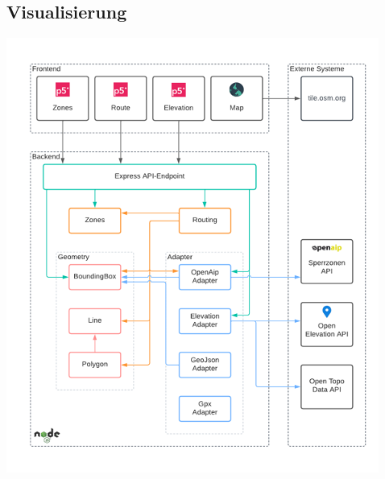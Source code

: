 \subsection*{Visualisierung}







\begin{center}
    \includegraphics[width=\columnwidth]{images/architektur}
    \label{fig:REPLACE}
\end{center}

